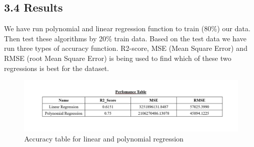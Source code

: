 \documentclass[conference]{IEEEtran}[10]
\begin{document}
\subsection{3.4 Results}
We have run polynomial and linear regression function to train (80\%) our data. Then test these algorithms by 20\% train data. Based on the test data we have run three types of accuracy function. R2-score, MSE (Mean Square Error) and RMSE (root Mean Square Error) is being used to find which of these two regressions is best for the dataset.
\begin{figure}[H]
\centering
\includegraphics[scale=0.25]{performancetable}
\caption{ Accuracy table for linear and polynomial regression}
\end{figure}



\end{document}
